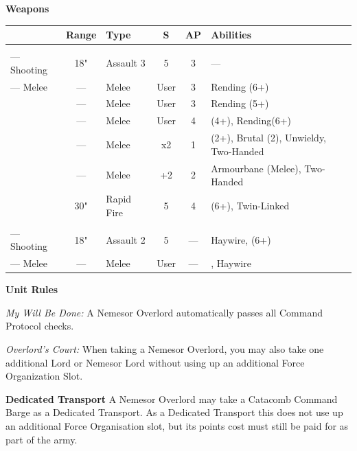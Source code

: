 \begin{minipage}[t]{0.72\textwidth}
	\vspace*{2em}
	\textbf{Weapons}
	
	\begin{tabular}{L{90 pt} c C{40pt} *{2}{c} >{\raggedright\arraybackslash}p{130pt}}
		& Range & Type & S & AP & Abilities \\
		\hline
		 & & &  &  &  \\
		— Shooting & 18" & Assault 3 & 5 & 3 & — \\
		— Melee & — & Melee & User & 3 & Rending (6+) \\
		 & — & Melee & User & 3 & Rending (5+) \\
		 & — & Melee & User & 4 &  (4+), Rending(6+) \\
		 & — & Melee & x2 & 1 &  (2+), Brutal (2), Unwieldy, Two-Handed \\
		 & — & Melee & +2 & 2 & Armourbane (Melee), Two-Handed \\
		 & 30" & Rapid Fire & 5 & 4 &  (6+), Twin-Linked \\	
		 & & &  &  &  \\
		— Shooting & 18" & Assault 2 & 5 & — & Haywire,  (6+) \\
		— Melee & — & Melee & User & — & , Haywire \\
	\end{tabular}
	
	\vspace*{2em}
	\textbf{Unit Rules}
	
	\textit{My Will Be Done:} A Nemesor Overlord automatically passes all Command Protocol checks.
	
	\textit{Overlord's Court:} When taking a Nemesor Overlord, you may also take one additional Lord or Nemesor Lord without using up an additional Force Organization Slot. 
	
	\vspace*{2em}
	\textbf{Dedicated Transport}
	A Nemesor Overlord may take a Catacomb Command Barge as a Dedicated Transport. As a Dedicated Transport this does not use up an additional Force Organisation slot, but its points cost must still be paid for as part of the army.
	

\end{minipage}
